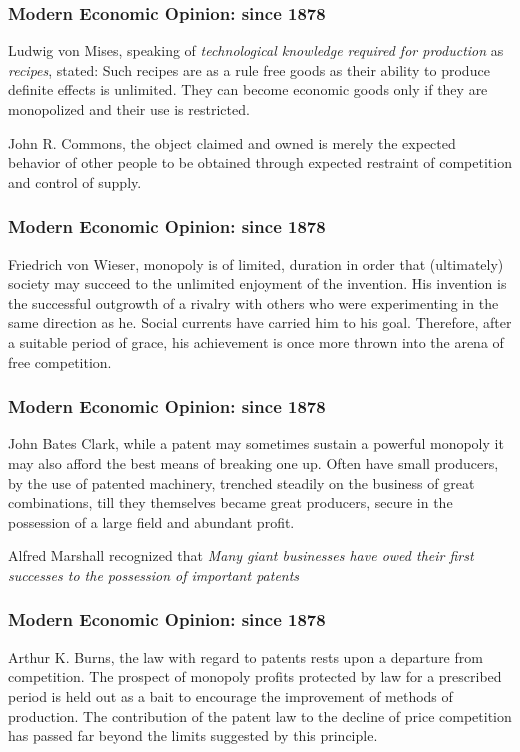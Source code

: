 \begin{frame}
\frametitle{Modern Economic Opinion: since 1878}
Ludwig von Mises, speaking of \textit{technological knowledge required for production} as \textit{recipes}, stated:
Such recipes are as a rule free goods as their ability to produce definite effects is unlimited. They can become economic goods only if they are monopolized and their use is restricted.

John R. Commons, the object claimed and owned is merely the expected behavior of other people to be obtained through expected restraint of competition and control of supply.
\end{frame}


\begin{frame}
\frametitle{Modern Economic Opinion: since 1878}
Friedrich von Wieser, monopoly is of limited, duration in order that (ultimately) society may succeed to the unlimited enjoyment of the invention. His invention is the successful outgrowth of a rivalry with others who were experimenting in the same direction as he. Social currents have carried him to his goal. Therefore, after a suitable period of grace, his achievement is once more thrown into the arena of free competition.
\end{frame}


\begin{frame}
\frametitle{Modern Economic Opinion: since 1878}
John Bates Clark, while a patent may sometimes sustain a powerful monopoly it may also afford the best means of breaking one up. Often have small producers, by the use of patented machinery, trenched steadily on the business of great combinations, till they themselves became great producers, secure in the possession of a large field and abundant profit.

Alfred Marshall recognized that \textit{Many giant businesses have owed their first successes to the possession of important patents}
\end{frame}

\begin{frame}
\frametitle{Modern Economic Opinion: since 1878}
Arthur K. Burns, the law with regard to patents rests upon a departure from competition. The prospect of monopoly profits protected by law for a prescribed period is held out as a bait to encourage the improvement of methods of production. The contribution of the patent law to the decline of price competition has passed far beyond the limits suggested by this principle.
\end{frame}


